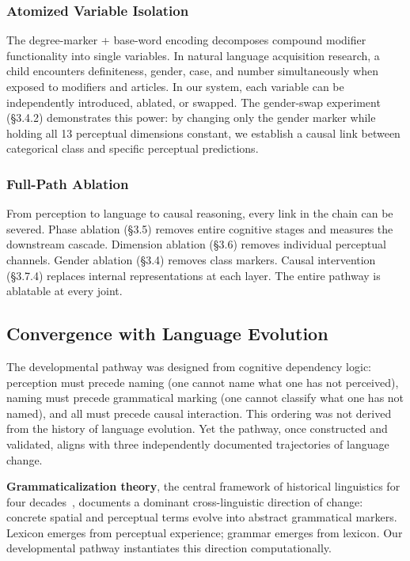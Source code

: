 \documentclass{article}
\begin{document}
\subsubsection{Atomized Variable Isolation}

The degree-marker + base-word encoding decomposes compound modifier functionality into single variables. In natural language acquisition research, a child encounters definiteness, gender, case, and number simultaneously when exposed to modifiers and articles. In our system, each variable can be independently introduced, ablated, or swapped. The gender-swap experiment (\S3.4.2) demonstrates this power: by changing only the gender marker while holding all 13 perceptual dimensions constant, we establish a causal link between categorical class and specific perceptual predictions.

\subsubsection{Full-Path Ablation}

From perception to language to causal reasoning, every link in the chain can be severed. Phase ablation (\S3.5) removes entire cognitive stages and measures the downstream cascade. Dimension ablation (\S3.6) removes individual perceptual channels. Gender ablation (\S3.4) removes class markers. Causal intervention (\S3.7.4) replaces internal representations at each layer. The entire pathway is ablatable at every joint.

\subsection{Convergence with Language Evolution}

The developmental pathway was designed from cognitive dependency logic: perception must precede naming (one cannot name what one has not perceived), naming must precede grammatical marking (one cannot classify what one has not named), and all must precede causal interaction. This ordering was not derived from the history of language evolution. Yet the pathway, once constructed and validated, aligns with three independently documented trajectories of language change.

\textbf{Grammaticalization theory}, the central framework of historical linguistics for four decades~\citep{heine2002,traugott2002,bybee2010}, documents a dominant cross-linguistic direction of change: concrete spatial and perceptual terms evolve into abstract grammatical markers. Lexicon emerges from perceptual experience; grammar emerges from lexicon. Our developmental pathway instantiates this direction computationally.
\end{document}
